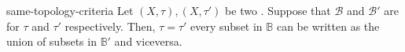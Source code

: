 \documentclass[preview]{standalone}
\begin{document}
\begin{snippetlemma}{same-topology-criteria}{}
    Let \((X, \tau), (X, \tau')\) be two .
    Suppose that \(\mathcal{B}\) and \(\mathcal{B}'\)
    are \topologicalbasis for \(\tau\) and \(\tau'\) respectively.
    Then, \(\tau = \tau'\) \ifandonlyif every subset in \(\mathbb{B}\) can be written as the union of subsets in \(\mathbb{B}'\)
    and viceversa.
\end{snippetlemma}
\end{document}
